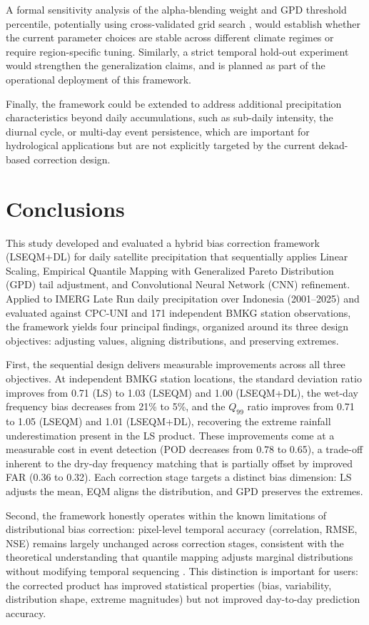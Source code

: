 \documentclass[11pt,a4paper]{article}
\begin{document}
A formal sensitivity analysis of the alpha-blending weight and GPD
threshold percentile, potentially using cross-validated grid search
\cite{ref43}, would establish whether the current parameter choices are
stable across different climate regimes or require region-specific
tuning. Similarly, a strict temporal hold-out experiment would
strengthen the generalization claims, and is planned as part of the
operational deployment of this framework.

Finally, the framework could be extended to address additional
precipitation characteristics beyond daily accumulations, such as
sub-daily intensity, the diurnal cycle, or multi-day event persistence,
which are important for hydrological applications but are not explicitly
targeted by the current dekad-based correction design.

\section{Conclusions}\label{conclusions}

This study developed and evaluated a hybrid bias correction framework
(LSEQM+DL) for daily satellite precipitation that sequentially applies
Linear Scaling, Empirical Quantile Mapping with Generalized Pareto
Distribution (GPD) tail adjustment, and Convolutional Neural Network
(CNN) refinement. Applied to IMERG Late Run daily precipitation over
Indonesia (2001--2025) and evaluated against CPC-UNI and 171 independent
BMKG station observations, the framework yields four principal findings,
organized around its three design objectives: adjusting values, aligning
distributions, and preserving extremes.

First, the sequential design delivers measurable improvements across all
three objectives. At independent BMKG station locations, the standard
deviation ratio improves from 0.71 (LS) to 1.03 (LSEQM) and 1.00
(LSEQM+DL), the wet-day frequency bias decreases from 21\% to 5\%, and
the \(Q_{99}\) ratio improves from 0.71 to 1.05 (LSEQM) and 1.01
(LSEQM+DL), recovering the extreme rainfall underestimation present in
the LS product. These improvements come at a measurable cost in event
detection (POD decreases from 0.78 to 0.65), a trade-off inherent to the
dry-day frequency matching \cite{ref11} that is partially offset by improved
FAR (0.36 to 0.32). Each correction stage targets a distinct bias
dimension: LS adjusts the mean, EQM aligns the distribution, and GPD
preserves the extremes.

Second, the framework honestly operates within the known limitations of
distributional bias correction: pixel-level temporal accuracy
(correlation, RMSE, NSE) remains largely unchanged across correction
stages, consistent with the theoretical understanding that quantile
mapping adjusts marginal distributions without modifying temporal
sequencing \cite{ref34}. This distinction is important for users: the
corrected product has improved statistical properties (bias,
variability, distribution shape, extreme magnitudes) but not improved
day-to-day prediction accuracy.
\end{document}
